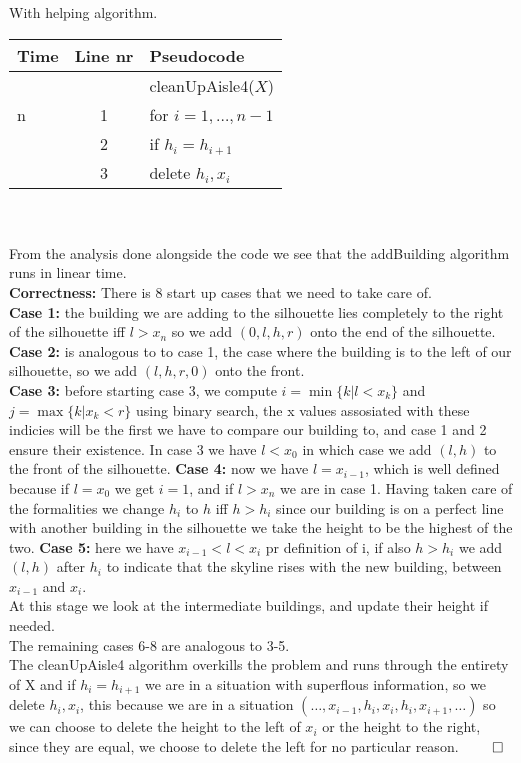 \documentclass{article}
\theoremstyle{remark}
\numberwithin{equation}{section}
\begin{document}
	With helping algorithm.\\
	\begin{tabular}{l | c | l}
		Time & Line nr & Pseudocode \\ \hline
		           &   & cleanUpAisle4($X$)\\
		n          & 1 & for $i=1,\dots ,n-1$\\
		\indent 1  & 2 & \indent if $h_i=h_{i+1}$\\
		\indent\indent 2& 3 & \indent \indent delete $h_{i},x_{i}$
	\end{tabular}\\\\
	From the analysis done alongside the code we see that the addBuilding algorithm runs in linear time.
	\\\textbf{Correctness:} There is 8 start up cases that we need to take care of.\\
	\textbf{Case 1:} the building we are adding to the silhouette lies completely to the right of the silhouette iff $l>x_n$ so we add $(0,l,h,r)$ onto the end of the silhouette. \textbf{Case 2:} is analogous to to case 1, the case where the building is to the left of our silhouette, so we add $(l,h,r,0)$ onto the front.
	\\\textbf{Case 3:} before starting case 3, we compute $i=\min\{k|l<x_k\}$ and $j=\max\{k|x_k<r\}$ using binary search, the x values assosiated with these indicies will be the first we have to compare our building to, and case 1 and 2 ensure their existence. In case 3 we have $l<x_0$ in which case we add $(l,h)$ to the front of the silhouette. \textbf{Case 4:} now we have $l=x_{i-1}$, which is well defined because if $l=x_0$ we get $i = 1$, and if $l>x_n$ we are in case 1. Having taken care of the formalities we change $h_i$ to $h$ iff $h>h_i$ since our building is on a perfect line with another building in the silhouette we take the height to be the highest of the two. \textbf{Case 5:} here we have $x_{i-1}<l<x_i$ pr definition of i, if also $h>h_i$ we add $(l,h)$ after $h_i$ to indicate that the skyline rises with the new building, between $x_{i-1}$ and $x_i$.
	\\At this stage we look at the intermediate buildings, and update their height if needed.
	\\The remaining cases 6-8 are analogous to 3-5. 
	\\The cleanUpAisle4 algorithm overkills the problem and runs through the entirety of X and if $h_i = h_{i+1}$ we are in a situation with superflous information, so we delete $h_{i},x_{i}$, this because we are in a situation $(\dots, x_{i-1},h_i,x_{i},h_i,x_{i+1},\dots )$ so we can choose to delete the height to the left of $x_i$ or the height to the right, since they are equal, we choose to delete the left for no particular reason. $\qed$
\end{document}
